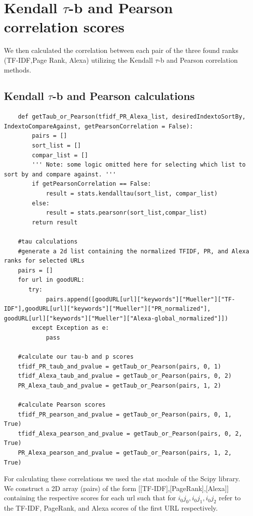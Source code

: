 \documentclass[11pt]{article}
\begin{document}
	\section{Kendall $\tau$-b and Pearson correlation scores}
	\hspace{10mm} We then calculated the correlation between each pair of the three found ranks (TF-IDF,Page Rank, Alexa) utilizing the Kendall $\tau$-b and Pearson correlation methods. 
	\subsection{Kendall $\tau$-b and Pearson calculations }
	\begin{lstlisting}
	def getTaub_or_Pearson(tfidf_PR_Alexa_list, desiredIndextoSortBy, IndextoCompareAgainst, getPearsonCorrelation = False):
	    pairs = []
	    sort_list = []
	    compar_list = []
	    ''' Note: some logic omitted here for selecting which list to sort by and compare against. '''
	    if getPearsonCorrelation == False:
	        result = stats.kendalltau(sort_list, compar_list)
	    else:
	        result = stats.pearsonr(sort_list,compar_list)
	    return result
	    
	#tau calculations
	#generate a 2d list containing the normalized TFIDF, PR, and Alexa ranks for selected URLs
	pairs = []
	for url in goodURL:
	   try:
	        pairs.append([goodURL[url]["keywords"]["Mueller"]["TF-IDF"],goodURL[url]["keywords"]["Mueller"]["PR_normalized"], goodURL[url]["keywords"]["Mueller"]["Alexa-global_normalized"]])
    	except Exception as e:
	        pass
	
	#calculate our tau-b and p scores
	tfidf_PR_taub_and_pvalue = getTaub_or_Pearson(pairs, 0, 1)
	tfidf_Alexa_taub_and_pvalue = getTaub_or_Pearson(pairs, 0, 2)
	PR_Alexa_taub_and_pvalue = getTaub_or_Pearson(pairs, 1, 2)
	
    #calculate Pearson scores	
	tfidf_PR_pearson_and_pvalue = getTaub_or_Pearson(pairs, 0, 1, True)
	tfidf_Alexa_pearson_and_pvalue = getTaub_or_Pearson(pairs, 0, 2, True)
	PR_Alexa_pearson_and_pvalue = getTaub_or_Pearson(pairs, 1, 2, True)
	\end{lstlisting}
	\hspace{10mm} For calculating these correlations we used the stat module of the Scipy library.  We construct a 2D array (pairs) of the form [[TF-IDF],[PageRank],[Alexa]] containing the respective scores for each url such that for ${i_0j_0, i_0j_1 , i_0j_2}$ refer to the TF-IDF, PageRank, and Alexa scores of the first URL respectively. 
	
\end{document}
